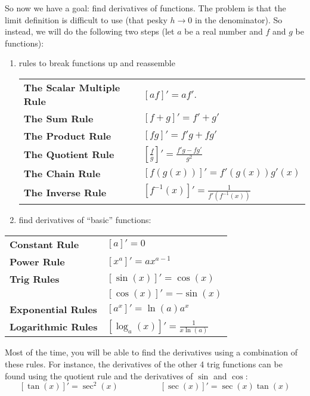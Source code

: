 So now we have a goal: find derivatives of functions. The problem is that the limit definition is difficult to use (that pesky $h\to 0$ in the denominator). So instead, we will do the following two steps (let $a$ be a real number and $f$ and $g$ be functions):
\begin{enumerate}
\item rules to break functions up and reassemble

\begin{center}
\def\arraystretch{1.5}
\begin{tabular}{@{}ll@{}}
\toprule[0.4mm]
\textbf{The Scalar Multiple Rule} & $[af]' = af'$. \\
\textbf{The Sum Rule} & $[f + g]' = f' + g'$ \\
\textbf{The Product Rule} & $[fg]' = f'g + fg'$ \\
\textbf{The Quotient Rule} & $\left[\frac{f}{g}\right]' = \frac{f'g - fg'}{g^2}$ \\
\textbf{The Chain Rule} & $[f(g(x))]' = f'(g(x))g'(x)$ \\
\textbf{The Inverse Rule} & $[f^{-1}(x)]' = \frac{1}{f'(f^{-1}(x))}$ \\
\bottomrule[0.4mm]
\end{tabular}
\end{center}

\item find derivatives of ``basic'' functions:

\end{enumerate}


\begin{center}
\def\arraystretch{1.5}
\begin{tabular}{@{}ll@{}}
\toprule[0.4mm]
\textbf{Constant Rule}     & $[a]' = 0$ \\
\textbf{Power Rule}        & $[x^a]' = ax^{a-1}$ \\
\textbf{Trig Rules}  & $[\sin(x)]' = \cos(x)$ \\
& $[\cos(x)]' = -\sin(x)$ \\
\textbf{Exponential Rules} & $[a^x]' = \ln(a)a^x$ \\
\textbf{Logarithmic Rules} & $[\log_a(x)]' = \frac{1}{x\ln(a)}$ \\
\bottomrule[0.4mm]
\end{tabular}
\end{center}


Most of the time, you will be able to find the derivatives using a combination of these rules. For instance, the derivatives of the other 4 trig functions can be found using the quotient rule and the derivatives of $\sin$ and $\cos$:
$$[\tan(x)]' = \sec^2(x)
\quad\quad\quad\quad\quad
[\sec(x)]' = \sec(x)\tan(x)$$

